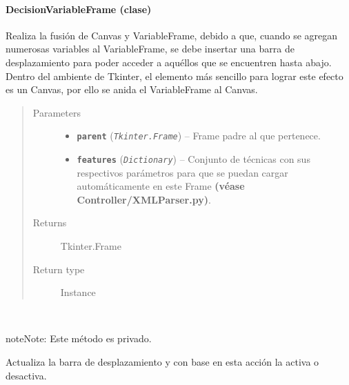 \documentclass[class=report, crop=false]{standalone}
\begin{document}
\paragraph{DecisionVariableFrame (clase)}
\label{sec:a_3_2_2_1}
\begin{fulllineitems}

\begin{DUlineblock}{0em}
\item[] Realiza la fusión de Canvas y VariableFrame, debido a que, 
cuando se agregan numerosas variables al VariableFrame, se debe 
insertar una barra de desplazamiento para poder acceder a aquéllos 
que se encuentren hasta abajo.\break
Dentro del ambiente de Tkinter, el elemento más sencillo para lograr 
este efecto es un Canvas, por ello se anida el VariableFrame al Canvas.
\end{DUlineblock}

\begin{quote}\begin{description}
\item[{Parameters}] \leavevmode\begin{itemize}
\item \textbf{\texttt{parent}} (\emph{\texttt{Tkinter.Frame}}) -- Frame padre al que pertenece.
\item \textbf{\texttt{features}} (\emph{\texttt{Dictionary}}) -- Conjunto de técnicas con sus respectivos parámetros para que se puedan cargar automáticamente en este Frame \textbf{(véase Controller/XMLParser.py)}.
\end{itemize}

\item[{Returns}] \leavevmode
Tkinter.Frame
\item[{Return type}] \leavevmode
Instance
\end{description}\end{quote}


\begin{fulllineitems}

~

\begin{notice}{note}{Note:}
Este método es privado.
\end{notice}

Actualiza la barra de desplazamiento y con base en esta acción
la activa o desactiva.


\end{fulllineitems}
\end{fulllineitems}
\end{document}
